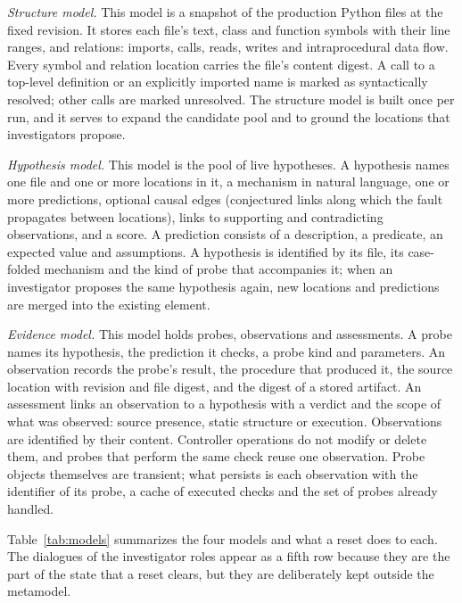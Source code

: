 \documentclass[a4paper,fleqn]{cas-sc}
\begin{document}
\emph{Structure model.} This model is a snapshot of the production Python files at the fixed revision. It stores each file's text, class and function symbols with their line ranges, and relations: imports, calls, reads, writes and intraprocedural data flow. Every symbol and relation location carries the file's content digest. A call to a top-level definition or an explicitly imported name is marked as syntactically resolved; other calls are marked unresolved. The structure model is built once per run, and it serves to expand the candidate pool and to ground the locations that investigators propose.

\emph{Hypothesis model.} This model is the pool of live hypotheses. A hypothesis names one file and one or more locations in it, a mechanism in natural language, one or more predictions, optional causal edges (conjectured links along which the fault propagates between locations), links to supporting and contradicting observations, and a score. A prediction consists of a description, a predicate, an expected value and assumptions. A hypothesis is identified by its file, its case-folded mechanism and the kind of probe that accompanies it; when an investigator proposes the same hypothesis again, new locations and predictions are merged into the existing element.

\emph{Evidence model.} This model holds probes, observations and assessments. A probe names its hypothesis, the prediction it checks, a probe kind and parameters. An observation records the probe's result, the procedure that produced it, the source location with revision and file digest, and the digest of a stored artifact. An assessment links an observation to a hypothesis with a verdict and the scope of what was observed: source presence, static structure or execution. Observations are identified by their content. Controller operations do not modify or delete them, and probes that perform the same check reuse one observation. Probe objects themselves are transient; what persists is each observation with the identifier of its probe, a cache of executed checks and the set of probes already handled.

Table~\ref{tab:models} summarizes the four models and what a reset does to each. The dialogues of the investigator roles appear as a fifth row because they are the part of the state that a reset clears, but they are deliberately kept outside the metamodel.
\end{document}
